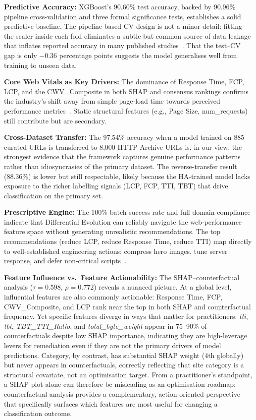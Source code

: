 \documentclass[sn-nature]{sn-jnl}
\begin{document}
\textbf{Predictive Accuracy:} XGBoost's 90.60\% test accuracy, backed by 90.96\% pipeline cross-validation and three formal significance tests, establishes a solid predictive baseline. The pipeline-based CV design is not a minor detail: fitting the scaler inside each fold eliminates a subtle but common source of data leakage that inflates reported accuracy in many published studies~\cite{xin2023}. That the test--CV gap is only $-0.36$ percentage points suggests the model generalises well from training to unseen data.

\textbf{Core Web Vitals as Key Drivers:} The dominance of Response Time, FCP, LCP, and the CWV\_Composite in both SHAP and consensus rankings confirms the industry's shift away from simple page-load time towards perceived performance metrics~\cite{mathur2024, sehwag2024}. Static structural features (e.g., Page Size, num\_requests) still contribute but are secondary.

\textbf{Cross-Dataset Transfer:} The 97.54\% accuracy when a model trained on 885 curated URLs is transferred to 8,000 HTTP Archive URLs is, in our view, the strongest evidence that the framework captures genuine performance patterns rather than idiosyncrasies of the primary dataset. The reverse-transfer result (88.36\%) is lower but still respectable, likely because the HA-trained model lacks exposure to the richer labelling signals (LCP, FCP, TTI, TBT) that drive classification on the primary set.

\textbf{Prescriptive Engine:} The 100\% batch success rate and full domain compliance indicate that Differential Evolution can reliably navigate the web-performance feature space without generating unrealistic recommendations. The top recommendations (reduce LCP, reduce Response Time, reduce TTI) map directly to well-established engineering actions: compress hero images, tune server response, and defer non-critical scripts~\cite{vanriet2023, surianarayanan2023}.

\textbf{Feature Influence vs.\ Feature Actionability:} The SHAP--counterfactual analysis ($\tau = 0.598$, $\rho = 0.772$) reveals a nuanced picture. At a global level, influential features are also commonly actionable: Response Time, FCP, CWV\_Composite, and LCP rank near the top in both SHAP and counterfactual frequency. Yet specific features diverge in ways that matter for practitioners: \textit{tti}, \textit{tbt}, \textit{TBT\_TTI\_Ratio}, and \textit{total\_byte\_weight} appear in 75--90\% of counterfactuals despite low SHAP importance, indicating they are high-leverage levers for remediation even if they are not the primary drivers of model predictions. Category, by contrast, has substantial SHAP weight (4th globally) but never appears in counterfactuals, correctly reflecting that site category is a structural covariate, not an optimisation target. From a practitioner's standpoint, a SHAP plot alone can therefore be misleading as an optimisation roadmap; counterfactual analysis provides a complementary, action-oriented perspective that specifically surfaces which features are most useful for changing a classification outcome.
\end{document}
